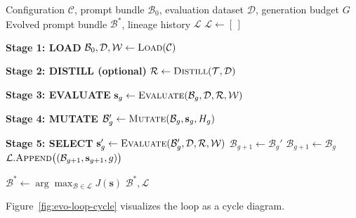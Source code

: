 \begin{algorithm}[H]
\caption{The Evolutionary Training Loop (\textsc{evo-trainer})}
\label{alg:evo-loop}
\begin{algorithmic}[1]
\Require Configuration $\mathcal{C}$, prompt bundle $\mathcal{B}_0$, evaluation dataset $\mathcal{D}$, generation budget $G$
\Ensure Evolved prompt bundle $\mathcal{B}^*$, lineage history $\mathcal{L}$
\State $\mathcal{L} \gets [\,]$ 

\medskip
\Statex \textbf{Stage 1: LOAD}
\State $\mathcal{B}_0, \mathcal{D}, \mathcal{W} \gets \textsc{Load}(\mathcal{C})$ 

\medskip
\Statex \textbf{Stage 2: DISTILL (optional)}
  \State $\mathcal{R} \gets \textsc{Distill}(\mathcal{T}, \mathcal{D})$ 
\EndIf

\medskip
{}
  \Statex \quad\textbf{Stage 3: EVALUATE}
  \State $\mathbf{s}_g \gets \textsc{Evaluate}(\mathcal{B}_g, \mathcal{D}, \mathcal{R}, \mathcal{W})$ 

  \medskip
  \Statex \quad\textbf{Stage 4: MUTATE}
  \State $\mathcal{B}_g' \gets \textsc{Mutate}(\mathcal{B}_g, \mathbf{s}_g, H_g)$ 

  \medskip
  \Statex \quad\textbf{Stage 5: SELECT}
  \State $\mathbf{s}_g' \gets \textsc{Evaluate}(\mathcal{B}_g', \mathcal{D}, \mathcal{R}, \mathcal{W})$ 
   
    \State $\mathcal{B}_{g+1} \gets \mathcal{B}_g'$ 
  \Else
    \State $\mathcal{B}_{g+1} \gets \mathcal{B}_g$ 
  \EndIf
  \State $\mathcal{L}.\textsc{Append}\bigl((\mathcal{B}_{g+1}, \mathbf{s}_{g+1}, g)\bigr)$ 
\EndFor

\medskip
\State $\mathcal{B}^* \gets \arg\max_{\mathcal{B} \in \mathcal{L}} J(\mathbf{s})$ 
\State \Return $\mathcal{B}^*, \mathcal{L}$
\end{algorithmic}
\end{algorithm}

\noindent
Figure~\ref{fig:evo-loop-cycle} visualizes the loop as a cycle diagram.

